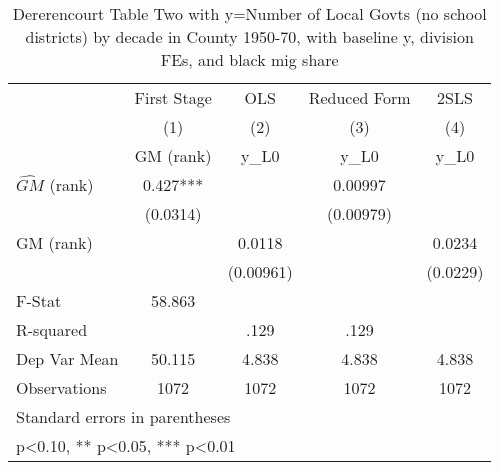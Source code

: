 \begin{table}[htbp]\centering
\def\sym#1{\ifmmode^{#1}\else\(^{#1}\)\fi}
\caption{Dererencourt Table Two with y=Number of Local Govts (no school districts) by decade in County 1950-70, with baseline y, division FEs, and black mig share}
\begin{tabular}{l*{4}{c}}
\toprule
                    & First Stage   &         OLS   &Reduced Form   &        2SLS   \\
                    &\multicolumn{1}{c}{(1)}&\multicolumn{1}{c}{(2)}&\multicolumn{1}{c}{(3)}&\multicolumn{1}{c}{(4)}\\
                    &\multicolumn{1}{c}{GM  (rank)}&\multicolumn{1}{c}{y\_L0}&\multicolumn{1}{c}{y\_L0}&\multicolumn{1}{c}{y\_L0}\\
\midrule
$\hat{GM}$ (rank)   &       0.427***&               &     0.00997   &               \\
                    &    (0.0314)   &               &   (0.00979)   &               \\
\addlinespace
GM  (rank)          &               &      0.0118   &               &      0.0234   \\
                    &               &   (0.00961)   &               &    (0.0229)   \\
\midrule
F-Stat              &      58.863   &               &               &               \\
R-squared           &               &        .129   &        .129   &               \\
Dep Var Mean        &      50.115   &       4.838   &       4.838   &       4.838   \\
Observations        &        1072   &        1072   &        1072   &        1072   \\
\bottomrule
\multicolumn{5}{l}{\footnotesize Standard errors in parentheses}\\
\multicolumn{5}{l}{\footnotesize * p<0.10, ** p<0.05, *** p<0.01}\\
\end{tabular}
\end{table}
